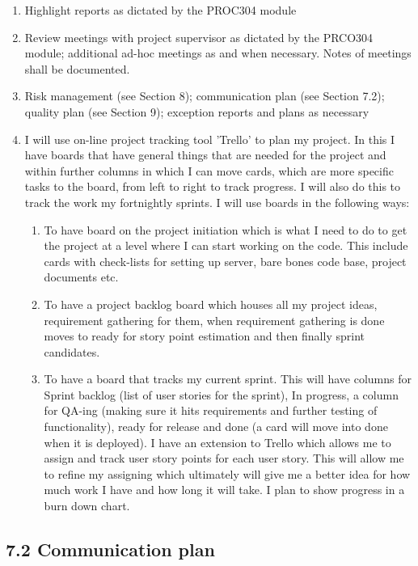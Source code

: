 \documentclass[a4paper]{article}
\begin{document}
\begin{enumerate}
    \item Highlight reports as dictated by the PROC304 module
    \item Review meetings with project supervisor as dictated by the PRCO304 module; additional ad-hoc meetings as and when necessary. Notes of meetings shall be documented.
    \item Risk management (see Section 8); communication plan (see Section 7.2); quality plan (see Section 9); exception reports and plans as necessary
    \item I will use on-line project tracking tool 'Trello' to plan my project. In this I have boards that have general things that are needed for the project and within further columns in which I can move cards, which are more specific tasks to the board, from left to right to track progress. I will also do this to track the work my fortnightly sprints. I will use boards in the following ways:
        \begin{enumerate}
            \item To have board on the project initiation which is what I need to do to get the project at a level where I can start working on the code. This include cards with check-lists for setting up server, bare bones code base, project documents etc.
            \item To have a project backlog board which houses all my project ideas, requirement gathering for them, when requirement gathering is done moves to ready for story point estimation and then finally sprint candidates.
            \item To have a board that tracks my current sprint. This will have columns for Sprint backlog (list of user stories for the sprint), In progress, a column for QA-ing (making sure it hits requirements and further testing of functionality), ready for release and done (a card will move into done when it is deployed). I have an extension to Trello which allows me to assign and track user story points for each user story. This will allow me to refine my assigning which ultimately will give me a better idea for how much work I have and how long it will take. I plan to show progress in a burn down chart.
        \end{enumerate}
 \end{enumerate}

\subsection{7.2 Communication plan}
\end{document}
